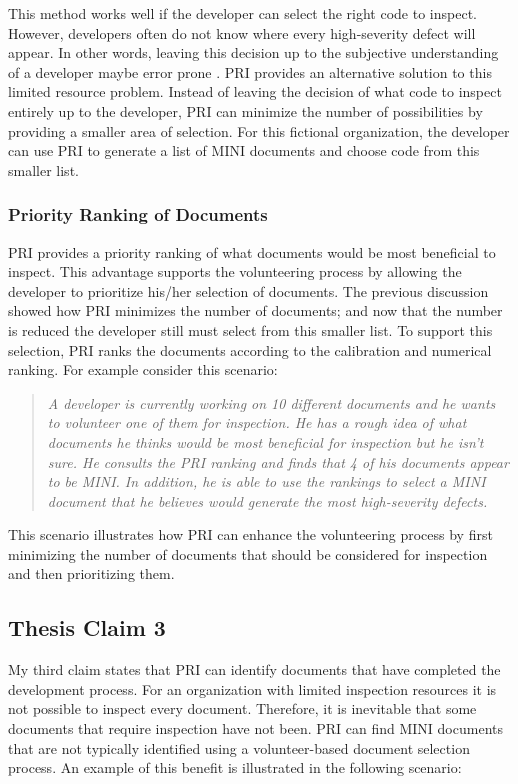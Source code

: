 This method works well if the developer can select the right code to
inspect. However, developers often do not know where every high-severity
defect will appear. In other words, leaving this decision up to the
subjective understanding of a developer maybe error prone \cite{Wiegers98}.
PRI provides an alternative solution to this limited resource problem.
Instead of leaving the decision of what code to inspect entirely up to the
developer, PRI can minimize the number of possibilities by providing a
smaller area of selection. For this fictional organization, the developer
can use PRI to generate a list of MINI documents and choose code from this
smaller list.

\subsubsection{Priority Ranking of Documents}
PRI provides a priority ranking of what documents would be most beneficial
to inspect. This advantage supports the volunteering process by allowing
the developer to prioritize his/her selection of documents. The previous
discussion showed how PRI minimizes the number of documents; and now that
the number is reduced the developer still must select from this smaller
list. To support this selection, PRI ranks the documents according to the
calibration and numerical ranking. For example consider this scenario:

\begin{quotation}
  \textit{ A developer is currently working on 10 different documents and
    he wants to volunteer one of them for inspection. He has a rough idea
    of what documents he thinks would be most beneficial for inspection but
    he isn't sure. He consults the PRI ranking and finds that 4 of his
    documents appear to be MINI. In addition, he is able to use the
    rankings to select a MINI document that he believes would generate the
    most high-severity defects.}
\end{quotation}

This scenario illustrates how PRI can enhance the volunteering process by
first minimizing the number of documents that should be considered for
inspection and then prioritizing them.

\subsection{Thesis Claim 3}
My third claim states that PRI can identify documents that have completed
the development process. For an organization with limited inspection
resources it is not possible to inspect every document. Therefore, it is
inevitable that some documents that require inspection have not been. PRI
can find MINI documents that are not typically identified using a
volunteer-based document selection process. An example of this benefit
is illustrated in the following scenario:

